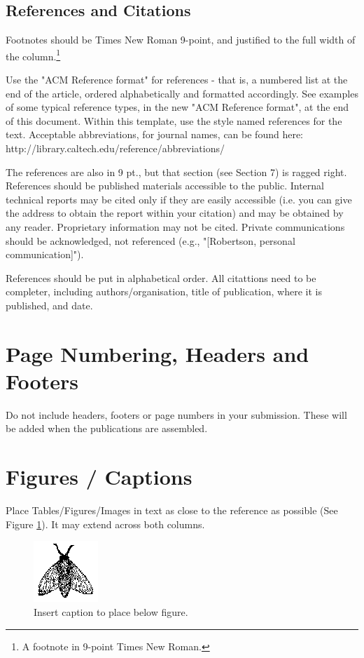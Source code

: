 \documentclass[acmtog, authorversion]{acmart}
\begin{document}
\subsection{References and Citations}
Footnotes should be Times New Roman 9-point, and justified to the 
full width of the column.\footnote{A footnote in 9-point Times New Roman.}

Use the "ACM Reference format" for references - that is, a numbered 
list at the end of the article, ordered alphabetically and formatted 
accordingly. See examples of some typical reference types, in the new 
"ACM Reference format", at the end of this document. Within this 
template, use the style named references for the text. Acceptable 
abbreviations, for journal names, can be found here: 
http://library.caltech.edu/reference/abbreviations/

The references are also in 9 pt., but that section (see Section 7) is 
ragged right. References should be published materials accessible to 
the public. Internal technical reports may be cited only if they are 
easily accessible (i.e. you can give the address to obtain the report 
within your citation) and may be obtained by any reader. Proprietary
information may not be cited. Private communications should be 
acknowledged, not referenced  (e.g., "[Robertson, personal communication]"). 

References should be put in alphabetical order. All citattions need to be completer, including authors/organisation, title of publication, where it is published, and date.

\section{Page Numbering, Headers and Footers}
Do not include headers, footers or page numbers in your submission. 
These will be added when the publications are assembled.

\section{Figures / Captions}
Place Tables/Figures/Images in text as close to the reference as possible 
(See Figure \ref{fig:abc}).  It may extend across both columns. 


\begin{figure}
    \centering
  \includegraphics{fly2.eps}
  \caption{Insert caption to place below figure.}
  \label{fig:abc}
\end{figure}
\end{document}
